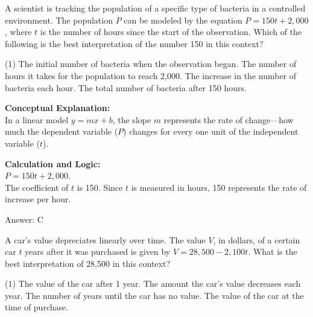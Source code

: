 \documentclass[11pt,paper=a4,answers]{exam}
\begin{document}
\begin{questions}
\pointsinrightmargin
\pointsdroppedatright
\marksnotpoints
{}
\pointformat{\boldmath\themarginpoints}
\bracketedpoints




\question
A scientist is tracking the population of a specific type of bacteria in a controlled environment. The population $P$ can be modeled by the equation $P = 150t + 2,000$, where $t$ is the number of hours since the start of the observation. Which of the following is the best interpretation of the number 150 in this context?
\begin{tasks}(1)
    \task The initial number of bacteria when the observation began.
    \task The number of hours it takes for the population to reach 2,000.
    \task The increase in the number of bacteria each hour.
    \task The total number of bacteria after 150 hours.
\end{tasks}

\begin{solution}
\textbf{Conceptual Explanation:} \\
In a linear model $y = mx + b$, the slope $m$ represents the rate of change—how much the dependent variable ($P$) changes for every one unit of the independent variable ($t$).

\vspace{10pt}
\textbf{Calculation and Logic:} \\
$P = 150t + 2,000$. \\
The coefficient of $t$ is 150. Since $t$ is measured in hours, 150 represents the rate of increase per hour.

\vspace{15pt}
Answer: \colorbox{yellow!100}{C}
\end{solution}

\vspace{20pt}

\question
A car’s value depreciates linearly over time. The value $V$, in dollars, of a certain car $t$ years after it was purchased is given by $V = 28,500 - 2,100t$. What is the best interpretation of 28,500 in this context?
\begin{tasks}(1)
    \task The value of the car after 1 year.
    \task The amount the car's value decreases each year.
    \task The number of years until the car has no value.
    \task The value of the car at the time of purchase.
\end{tasks}


\end{questions}
\end{document}
